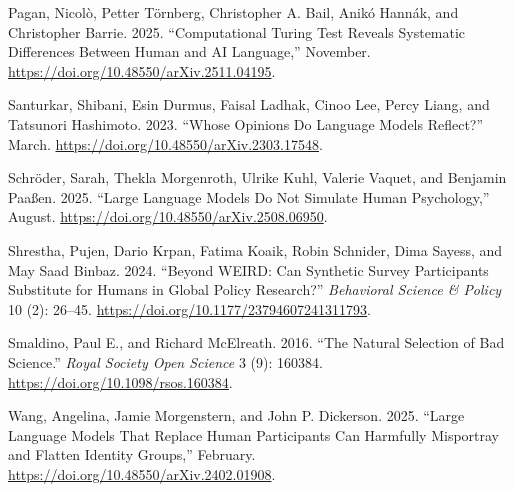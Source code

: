 \documentclass[
  letterpaper,
  DIV=11,
  numbers=noendperiod]{scrartcl}
\newlength{\cslhangindent}
\newenvironment{CSLReferences}[2] %
 {\begin{list}{}{%
  \setlength{\itemindent}{0pt}
  \setlength{\leftmargin}{0pt}
  \setlength{\parsep}{0pt}
  \ifodd #1
   \setlength{\leftmargin}{\cslhangindent}
   \setlength{\itemindent}{-1\cslhangindent}
  \fi
  \setlength{\itemsep}{#2\baselineskip}}}
 {\end{list}}
\begin{document}
\begin{CSLReferences}{1}{0}
Pagan, Nicolò, Petter Törnberg, Christopher A. Bail, Anikó Hannák, and
Christopher Barrie. 2025. {``Computational Turing Test Reveals
Systematic Differences Between Human and AI Language,''} November.
\url{https://doi.org/10.48550/arXiv.2511.04195}.

Santurkar, Shibani, Esin Durmus, Faisal Ladhak, Cinoo Lee, Percy Liang,
and Tatsunori Hashimoto. 2023. {``Whose Opinions Do Language Models
Reflect?''} March. \url{https://doi.org/10.48550/arXiv.2303.17548}.

Schröder, Sarah, Thekla Morgenroth, Ulrike Kuhl, Valerie Vaquet, and
Benjamin Paaßen. 2025. {``Large Language Models Do Not Simulate Human
Psychology,''} August. \url{https://doi.org/10.48550/arXiv.2508.06950}.

Shrestha, Pujen, Dario Krpan, Fatima Koaik, Robin Schnider, Dima Sayess,
and May Saad Binbaz. 2024. {``Beyond WEIRD: Can Synthetic Survey
Participants Substitute for Humans in Global Policy Research?''}
\emph{Behavioral Science \& Policy} 10 (2): 26--45.
\url{https://doi.org/10.1177/23794607241311793}.

Smaldino, Paul E., and Richard McElreath. 2016. {``The Natural Selection
of Bad Science.''} \emph{Royal Society Open Science} 3 (9): 160384.
\url{https://doi.org/10.1098/rsos.160384}.

Wang, Angelina, Jamie Morgenstern, and John P. Dickerson. 2025. {``Large
Language Models That Replace Human Participants Can Harmfully Misportray
and Flatten Identity Groups,''} February.
\url{https://doi.org/10.48550/arXiv.2402.01908}.

\end{CSLReferences}
\end{document}
